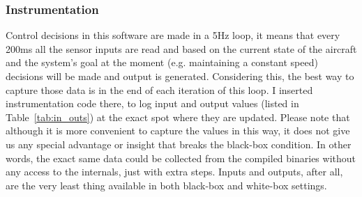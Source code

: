 \subsubsection{Instrumentation}
Control decisions in this software are made in a 5Hz loop, it means that every 200ms all the sensor inputs are read and based on the current state of the aircraft and the system's goal at the moment (e.g. maintaining a constant speed) decisions will be made and output is generated. Considering this, the best way to capture those data is in the end of each iteration of this loop. I inserted instrumentation code there, to log input and output values (listed in Table~\ref{tab:in_outs}) at the exact spot where they are updated. 
Please note that although it is more convenient to capture the values in this way, it does not give us any special advantage or insight that breaks the black-box condition. In other words, the exact same data could be collected from the compiled binaries without any access to the internals, just with extra steps. Inputs and outputs, after all, are the very least thing available in both black-box and white-box settings.

